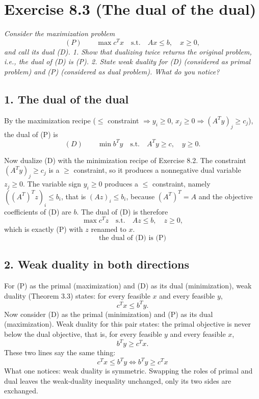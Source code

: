 \documentclass[a4paper,11pt]{article}
\newif\ifexplain
\newcommand{\aufgabe}[1]{\section*{#1}}
\newcommand{\angabe}[1]{\textit{#1}\par\smallskip}
\newcommand{\teil}[1]{\subsection*{#1}}
\newcommand{\explain}[1]{\ifexplain\begin{erklbox}#1\end{erklbox}\fi}
\begin{document}
\aufgabe{Exercise 8.3 (The dual of the dual)}
\angabe{Consider the maximization problem
\[
(P)\qquad \max c^Tx \quad\text{s.t.}\quad Ax \le b,\quad x \ge 0,
\]
and call its dual (D). 1. Show that dualizing twice returns the original problem, i.e., the dual of (D) is (P). 2. State weak duality for (D) (considered as primal problem) and (P) (considered as dual problem). What do you notice?}

\teil{1. The dual of the dual}
By the maximization recipe ($\le$ constraint $\Rightarrow y_i\ge0$, $x_j\ge0 \Rightarrow (A^Ty)_j\ge c_j$), the dual of (P) is
\[
(D)\qquad \min b^Ty \quad\text{s.t.}\quad A^Ty \ge c,\quad y \ge 0.
\]
\explain{(D) ist ein Minimierungsproblem. Seine Matrix ist $A^T$, seine rechte Seite ist $c$, seine Zielfunktionskoeffizienten sind $b$. Zum zweiten Dualisieren braucht man deshalb das Minimierungsrezept aus Aufgabe 8.2.}
Now dualize (D) with the minimization recipe of Exercise 8.2. The constraint $(A^Ty)_j\ge c_j$ is a $\ge$ constraint, so it produces a nonnegative dual variable $z_j\ge0$. The variable sign $y_i\ge0$ produces a $\le$ constraint, namely $((A^T)^Tz)_i\le b_i$, that is $(Az)_i\le b_i$, because $(A^T)^T=A$ and the objective coefficients of (D) are $b$. The dual of (D) is therefore
\[
\max c^Tz \quad\text{s.t.}\quad Az \le b,\quad z \ge 0,
\]
which is exactly (P) with $z$ renamed to $x$.
\[
\boxed{\text{the dual of (D) is (P)}}
\]
\explain{Jede Dualisierung tauscht Zielfunktion und rechte Seite und transponiert die Matrix. Zweimal angewendet heben sich Transponieren und Rollentausch gegenseitig auf: Aus $A$ wird über $A^T$ wieder $A$, aus $b$ über $c$ wieder $b$, aus $c$ über $b$ wieder $c$. Das Vorzeichen der Ungleichungen dreht sich zweimal und landet wieder bei $\le$.}

\teil{2. Weak duality in both directions}
For (P) as the primal (maximization) and (D) as its dual (minimization), weak duality (Theorem 3.3) states: for every feasible $x$ and every feasible $y$,
\[
c^Tx \le b^Ty.
\]
Now consider (D) as the primal (minimization) and (P) as its dual (maximization). Weak duality for this pair states: the primal objective is never below the dual objective, that is, for every feasible $y$ and every feasible $x$,
\[
b^Ty \ge c^Tx.
\]
These two lines say the same thing:
\[
\boxed{c^Tx \le b^Ty \iff b^Ty \ge c^Tx}
\]
What one notices: weak duality is symmetric. Swapping the roles of primal and dual leaves the weak-duality inequality unchanged, only its two sides are exchanged.
\explain{Beim Maximieren gilt für das primale (max) und das duale (min) Problem: primärer Wert $\le$ dualer Wert. Betrachtet man stattdessen das Minimierungsproblem als primal und das Maximierungsproblem als dual, lautet die Regel: primärer (min) Wert $\ge$ dualer (max) Wert. Das ist dieselbe Ungleichung $c^Tx\le b^Ty$, nur von der anderen Seite gelesen.}
\end{document}
